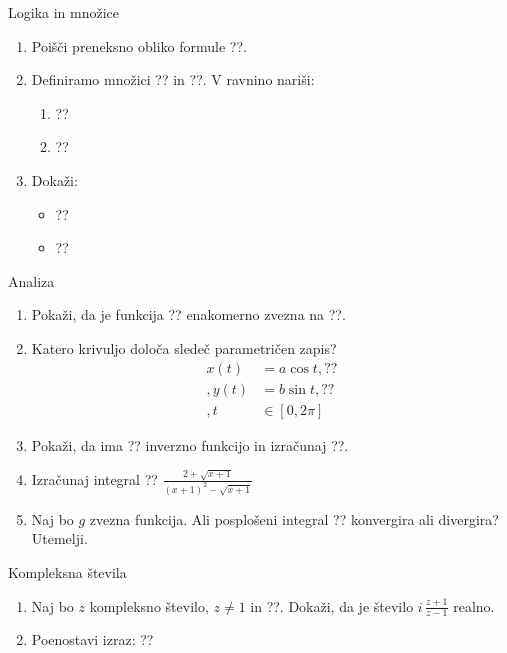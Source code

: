 \begin{frame}{Logika in množice}
	\begin{enumerate}
		\item
		Poišči preneksno obliko formule ??.
		\item 
		Definiramo množici ?? in ??.
		V ravnino nariši:
		\begin{enumerate}
		   \item ??
		   \item ??
		\end{enumerate}
		\item
		Dokaži:
		\begin{itemize}
			\item ??
			\item ??
		\end{itemize}
	\end{enumerate}
\end{frame}

\begin{frame}{Analiza}
	\begin{enumerate}
		\item
		Pokaži, da je funkcija ?? enakomerno zvezna na ??.
		\item 
		Katero krivuljo določa sledeč parametričen zapis?
		$$
		\begin{aligned}
		   x(t) &= a \cos t, ?? \\, %
		   y(t) &= b \sin t, ??\\, %
		   t &\in [0, 2 \pi]
		\end{aligned}
		   $$ 
		\item
		Pokaži, da ima ?? inverzno funkcijo in izračunaj ??.
		
		\item
		Izračunaj integral 
		??
		$\displaystyle \frac{2+\sqrt{x+1}}{(x+1)^2-\sqrt{x+1}}$
		\item 
		Naj bo $g$ zvezna funkcija. Ali posplošeni integral 
		??
		konvergira ali divergira? Utemelji.
	\end{enumerate}
\end{frame}

\begin{frame}{Kompleksna števila}
	\begin{enumerate}
		\item
		Naj bo $z$ kompleksno število, $z \ne 1$ in ??.
		Dokaži, da je število \( i \, \frac{z+1}{z-1} \) realno.
		\item
		Poenostavi izraz:
		??
	\end{enumerate}
\end{frame}